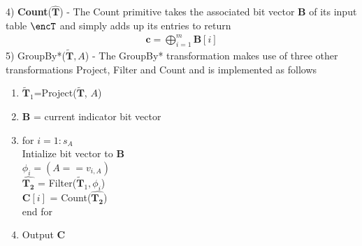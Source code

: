 4) \textbf{\textsf{Count}}($\mathbf{\hat{T}}$) - The \textsf{Count} primitive takes the associated bit vector $\mathbf{B}$ of its input table $\encT$  and simply adds up its entries to return  \begin{gather}\mathbf{c}=\bigoplus_{i=1}^m\mathbf{B}[i]\end{gather}%
5) \textsf{GroupBy*}($\mathbf{\tilde{T}},A$) - The \textsf{GroupBy*} transformation   makes use of three other transformations \textsf{Project, Filter} and \textsf{Count} and is implemented as follows
\begin{enumerate}[label=\alph*)] \item $\mathbf{\tilde{T}}_1$=\textsf{Project}($\mathbf{\tilde{T}}$, $A$) \item $\mathbf{B}$ =  current indicator bit vector \item  for $i = 1:s_A $ \\Intialize bit vector to $\mathbf{B}$  \\$\phi_i= (A==v_{i,A}) $ \\$\hat{\mathbf{T_2}}$ = \textsf{Filter}($\mathbf{\tilde{T}}_1, \phi_i$)\\ $\mathbf{C}[i]$ = \textsf{Count}($\hat{\mathbf{T_2}}$) \\ end for \item Output $\mathbf{C}$ 
\end{enumerate}
